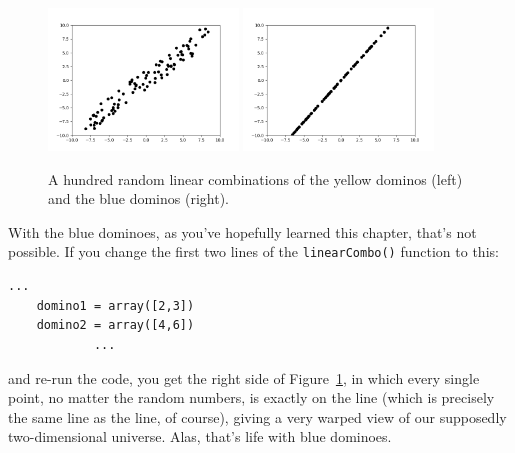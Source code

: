\begin{figure}[ht]
\centering
\includegraphics[width=0.45\textwidth]{plot_yellow.png}
\includegraphics[width=0.45\textwidth]{plot_blue.png}
\caption{A hundred random linear combinations of the yellow dominos (left) and
the blue dominos (right).}
\label{fig:plot}
\end{figure}

With the blue dominoes, as you've hopefully learned this chapter, that's not
possible. If you change the first two lines of the \texttt{linearCombo()}
function to this:

\begin{Verbatim}[fontsize=\small,samepage=true,frame=single,framesep=3mm]
            ...
    domino1 = array([2,3])
    domino2 = array([4,6])
            ...
\end{Verbatim}

and re-run the code, you get the right side of Figure~\ref{fig:plot}, in which
every single point, no matter the random numbers, is exactly on the 
line (which is precisely the same line as the 
 line, of course), giving a very warped view of our supposedly two-dimensional
universe. Alas, that's life with blue dominoes.

